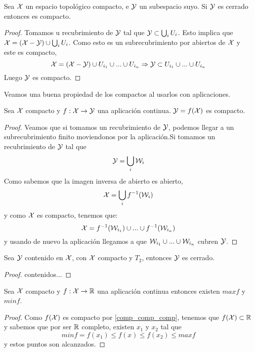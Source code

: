 \begin{prop}
	Sea $\mathcal{X}$ un espacio topológico compacto, e $\mathcal{Y}$ un subespacio suyo. Si $\mathcal{Y}$ es cerrado entonces es compacto.
	\begin{proof}
		Tomamos u recubrimiento de $\mathcal{Y}$ tal que $\mathcal{Y} \subset \bigcup_{i}U_i$. Esto implica que $\mathcal{X} = (\mathcal{X}-\mathcal{Y}) \cup \bigcup_{i}U_i$. Como esto es un subrecubrimiento por abiertos de $\mathcal{X}$ y este es compacto,
		\begin{equation}
			\mathcal{X} = (\mathcal{X}-\mathcal{Y}) \cup U_{i_1} \cup ... \cup U_{i_n} \Rightarrow \mathcal{Y} \subset U_{i_1} \cup ... \cup U_{i_n}
		\end{equation}
		Luego $\mathcal{Y}$ es compacto.
	\end{proof}
\end{prop}


Veamos una buena propiedad de los compactos al usarlos con aplicaciones.


\begin{prop}
	\label{comp_comp_comp}
	Sea $\mathcal{X}$ compacto y $f:\mathcal{X} \rightarrow \mathcal{Y}$ una aplicación continua. $\mathcal{Y} = f(\mathcal{X})$ es compacto.
	\begin{proof}
		Veamos que si tomamos un recubrimiento de $\mathcal{Y}$, podemos llegar a un subrecubrimiento finito moviendonos por la aplicación.Si tomamos un recubrimiento de $\mathcal{Y}$ tal que
		\begin{equation}
			\mathcal{Y} = \bigcup_{i}\mathcal{W}_i
		\end{equation}
		Como sabemos que la imagen inversa de abierto es abierto,
		\begin{equation}
			\mathcal{X} = \bigcup_{i}f^{-1}(\mathcal{W}_i)
		\end{equation}
		y como $\mathcal{X}$ es compacto, tenemos que:
		\begin{equation}
			\mathcal{X}  = f^{-1}(\mathcal{W}_{i_1}) \cup ... \cup f^{-1}(\mathcal{W}_{i_n})
		\end{equation}
		y usando de nuevo la aplicación llegamos a que $\mathcal{W}_{i_1} \cup ... \cup \mathcal{W}_{i_n}$ cubren $\mathcal{Y}$.
	\end{proof}
\end{prop}


\begin{prop}
	Sea $\mathcal{Y}$ contenido en $\mathcal{X}$, con $\mathcal{X}$ compacto y $T_{2}$, entonces $\mathcal{Y}$ es cerrado.
	\begin{proof}
		contenidos...
	\end{proof}
\end{prop}


\begin{prop}
	Sea $\mathcal{X}$ compacto y $f:\mathcal{X} \rightarrow \mathbb{R}$ una aplicación continua entonces existen $max f$ y $min f$.
	\begin{proof}
		Como $f(\mathcal{X})$ es compacto por \ref{comp_comp_comp}, tenemos que $f(\mathcal{X}) \subset \mathbb{R}$ y sabemos que por ser $\mathbb{R}$ completo, existen $x_1$ y $x_2$ tal que
		\begin{equation}
			min f = f(x_1) \leq f(x) \leq f(x_2) \leq max f
		\end{equation}
		y estos puntos son alcanzados.
	\end{proof}
\end{prop}


